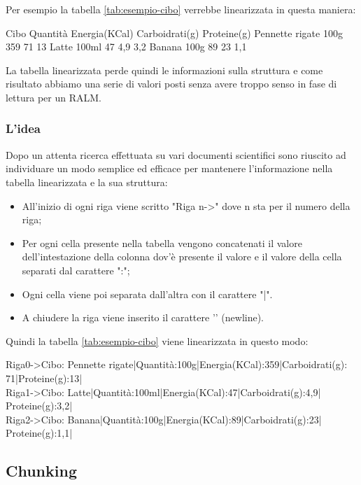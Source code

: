 \noindent Per esempio la tabella \ref{tab:esempio-cibo} verrebbe linearizzata in questa maniera:
\begin{tcolorbox}[colback=white, colframe=black]
    Cibo Quantità Energia(KCal) Carboidrati(g) Proteine(g) Pennette rigate  100g  359  71  13 Latte 100ml 47 4,9 3,2 Banana  100g 89 23 1,1
\end{tcolorbox}
\noindent La tabella linearizzata perde quindi le informazioni sulla struttura e come risultato abbiamo una serie di valori posti senza avere troppo senso in fase di lettura per un RALM. \\

\subsubsection{L'idea}
\noindent Dopo un attenta ricerca effettuata su vari documenti scientifici sono riuscito ad individuare un modo semplice ed efficace per mantenere 
l'informazione nella tabella linearizzata e la sua struttura:
\begin{itemize}
    \item All'inizio di ogni riga viene scritto "Riga n->" dove n sta per il numero della riga;
    \item Per ogni cella presente nella tabella vengono concatenati il valore dell'intestazione della colonna dov'è presente il valore e il valore della cella separati dal carattere ":";
    \item Ogni cella viene poi separata dall'altra con il carattere "|".
    \item A chiudere la riga viene inserito il carattere '\n' (newline).
\end{itemize} 

Quindi la tabella \ref{tab:esempio-cibo} viene linearizzata in questo modo:
\begin{tcolorbox}[colback=white, colframe=black]
    Riga0->Cibo: Pennette rigate|Quantità:100g|Energia(KCal):359|Carboidrati(g): \\
    71|Proteine(g):13| \\
    Riga1->Cibo: Latte|Quantità:100ml|Energia(KCal):47|Carboidrati(g):4,9|\\
    Proteine(g):3,2| \\
    Riga2->Cibo: Banana|Quantità:100g|Energia(KCal):89|Carboidrati(g):23|\\
    Proteine(g):1,1|
\end{tcolorbox}

\subsection{Chunking}
